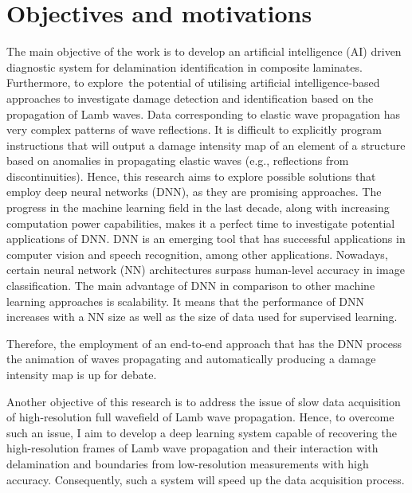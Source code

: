 \section{Objectives and motivations}
\label{sec13}

The main objective of the work is to develop an artificial intelligence (AI) driven diagnostic system for delamination identification in composite laminates.
Furthermore, to explore the potential of utilising artificial intelligence-based approaches to investigate damage detection and identification based on the propagation of Lamb waves.
Data corresponding to elastic wave propagation has very complex patterns of wave reflections. 
It is difficult to explicitly program instructions that will output a damage intensity map of an element of a structure based on anomalies in propagating elastic waves (e.g., reflections from discontinuities).
Hence, this research aims to explore possible solutions that employ deep neural networks (DNN), as they are promising approaches.
The progress in the machine learning field in the last decade, along with increasing computation power capabilities, makes it a perfect time to investigate potential applications of DNN. 
DNN is an emerging tool that has successful applications in computer vision and speech recognition, among other applications. 
Nowadays, certain neural network (NN) architectures surpass human-level accuracy in image classification. 
The main advantage of DNN in comparison to other machine learning approaches is scalability. 
It means that the performance of DNN increases with a NN size as well as the size of data used for supervised learning. 

Therefore, the employment of an end-to-end approach that has the DNN process the animation of waves propagating and automatically producing a damage intensity map is up for debate.

Another objective of this research is to address the issue of slow data acquisition of high-resolution full wavefield of Lamb wave propagation.
Hence, to overcome such an issue, I aim to develop a deep learning system capable of recovering the high-resolution frames of Lamb wave propagation and their interaction with delamination and boundaries from low-resolution measurements with high accuracy.
Consequently, such a system will speed up the data acquisition process.


